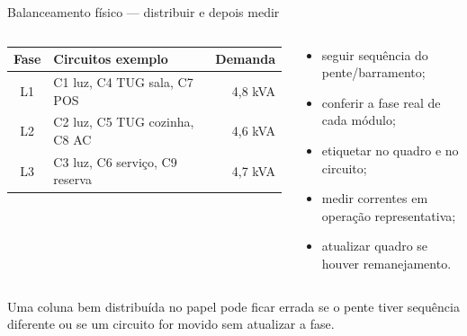 \begin{frame}{Balanceamento físico — distribuir e depois medir}
\scriptsize
\begin{columns}[T,onlytextwidth]
\begin{tabular}{c l r}
\toprule
Fase & Circuitos exemplo & Demanda \\
\midrule
L1 & C1 luz, C4 TUG sala, C7 POS & 4,8 kVA \\
L2 & C2 luz, C5 TUG cozinha, C8 AC & 4,6 kVA \\
L3 & C3 luz, C6 serviço, C9 reserva & 4,7 kVA \\
\bottomrule
\end{tabular}
\begin{caixaProjeto}[title=Na montagem]
\begin{itemize}
\item seguir sequência do pente/barramento;
\item conferir a fase real de cada módulo;
\item etiquetar no quadro e no circuito;
\item medir correntes em operação representativa;
\item atualizar quadro se houver remanejamento.
\end{itemize}
\end{caixaProjeto}
\end{columns}
\begin{caixaAt}
Uma coluna bem distribuída no papel pode ficar errada se o pente tiver sequência diferente ou se um circuito for movido sem atualizar a fase.
\end{caixaAt}
\end{frame}

